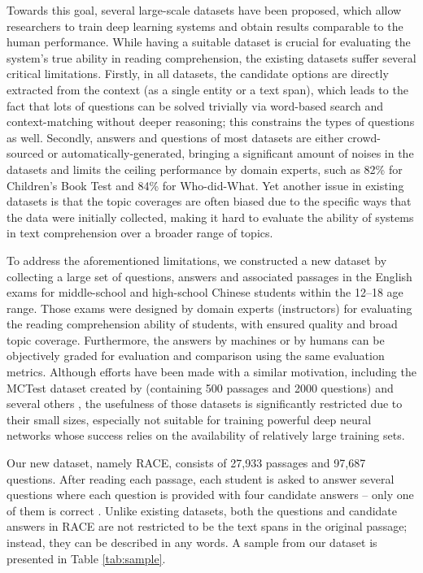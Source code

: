 Towards this goal, several large-scale datasets \cite{rajpurkar2016squad, onishi2016did, hill2015goldilocks, trischler2016newsqa,hermann2015teaching} have been proposed, which allow researchers to train deep learning systems and obtain results comparable to the human performance. While having a suitable dataset is crucial for evaluating the system's true ability in reading comprehension, the existing datasets suffer several critical limitations. Firstly, in all datasets, the candidate options are directly extracted from the context (as a single entity or a text span), which leads to the fact that lots of questions can be solved trivially via word-based search and context-matching without deeper reasoning; this constrains the types of questions as well. Secondly, answers and questions of most datasets are either crowd-sourced or automatically-generated, bringing a significant amount of noises in the datasets and limits the ceiling performance by domain experts, such as 82\% for { Children’s Book Test} and 84\% for Who-did-What. Yet another issue in existing datasets is that the topic coverages are often biased due to the specific ways that the data were initially collected, making it hard to evaluate the ability of systems in text comprehension over a broader range of topics.

To address the aforementioned limitations, we constructed a new dataset by collecting a large set of questions, answers and associated passages in the English exams for middle-school and high-school Chinese students within the 12--18 age range. Those exams were designed by domain experts (instructors) for evaluating the reading comprehension ability of students, with ensured quality and broad topic coverage. Furthermore, the answers by machines or by humans can be objectively graded for evaluation and comparison using the same evaluation metrics. Although efforts have been made with a similar motivation, including the MCTest dataset created by \cite{richardson2013mctest} (containing 500 passages and 2000 questions) and several others \cite{penas2014overview, rodrigo2015overview, khashabi2016question, shibuki2014overview}, the usefulness of those datasets is significantly restricted due to their small sizes, especially not suitable for training powerful deep neural networks whose success relies on the availability of relatively large training sets.

Our new dataset, namely RACE, consists of 27,933 passages and 97,687 questions. After reading each passage, each student is asked to answer several questions where each question is provided with four candidate answers -- only one of them is correct . Unlike existing datasets, both the questions and candidate answers in RACE are not restricted to be the text spans in the original passage; instead, they can be described in any words. A sample from our dataset is presented in Table \ref{tab:sample}.

